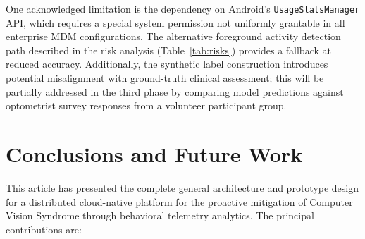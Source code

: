 \documentclass[conference]{IEEEtran}
\begin{document}
One acknowledged limitation is the dependency on Android's \texttt{UsageStatsManager}
API, which requires a special system permission not uniformly grantable in all enterprise
MDM configurations. The alternative foreground activity detection path described in the
risk analysis (Table~\ref{tab:risks}) provides a fallback at reduced accuracy.
Additionally, the synthetic label construction introduces potential misalignment with
ground-truth clinical assessment; this will be partially addressed in the third phase
by comparing model predictions against optometrist survey responses from a volunteer
participant group.

\section{Conclusions and Future Work}

This article has presented the complete general architecture and prototype design for
a distributed cloud-native platform for the proactive mitigation of Computer Vision
Syndrome through behavioral telemetry analytics. The principal contributions are:
\end{document}
